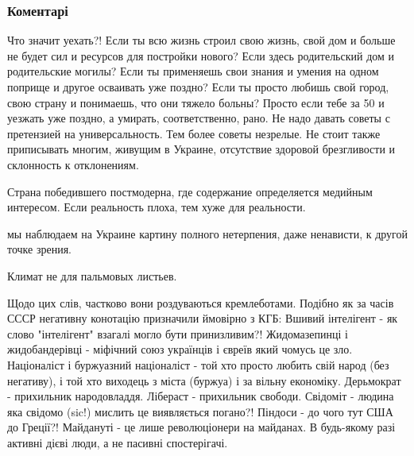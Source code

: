  
 
 
 
 
\subsubsection{Коментарі}

\begin{itemize} %

Что значит уехать?! Если ты всю жизнь строил свою жизнь, свой дом и больше не
будет сил и ресурсов для постройки нового? Если здесь родительский дом и
родительские могилы? Если ты применяешь свои знания и умения на одном поприще и
другое осваивать уже поздно? Если ты просто любишь свой город, свою страну и
понимаешь, что они тяжело больны? Просто если тебе за 50 и уезжать уже поздно,
а умирать, соответственно, рано. Не надо давать советы с претензией на
универсальность. Тем более советы незрелые. Не стоит также приписывать многим,
живущим в Украине, отсутствие здоровой брезгливости и склонность к отклонениям.

Страна победившего постмодерна, где содержание определяется медийным интересом. Если реальность плоха, тем хуже для реальности.

мы наблюдаем на Украине картину полного нетерпения, даже ненависти, к другой точке зрения.

Климат не для пальмовых листьев.


\obeycr
Щодо цих слів, частково вони роздуваються кремлеботами.
Подібно як за часів СССР негативну конотацію призначили ймовірно з КГБ:
Вшивий інтелігент - як слово "інтелігент" взагалі могло бути принизливим?!
Жидомазепинці і жидобандерівці - міфічний союз українців і євреїв який чомусь це зло.
Націоналіст і буржуазний націоналіст - той хто просто любить свій народ (без негативу), і той хто виходець з міста (буржуа) і за вільну економіку.
Дерьмократ - прихильник народовладдя.
Лібераст - прихильник свободи.
Свідоміт - людина яка свідомо (sic!) мислить це виявляється погано?!
Піндоси - до чого тут США до Греції?!
Майдануті - це лише революціонери на майданах. В будь-якому разі активні дієві люди, а не пасивні спостерігачі.
\restorecr


\end{itemize}
